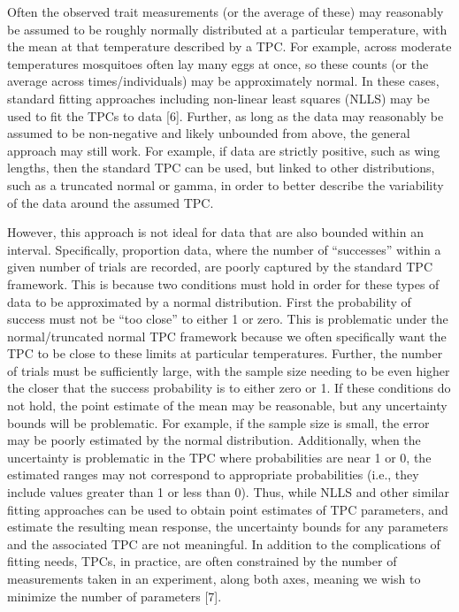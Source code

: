 \documentclass[
  11pt,
  letterpaper,
]{article}
\begin{document}
Often the observed trait measurements (or the average of these) may
reasonably be assumed to be roughly normally distributed at a particular
temperature, with the mean at that temperature described by a TPC. For
example, across moderate temperatures mosquitoes often lay many eggs at
once, so these counts (or the average across times/individuals) may be
approximately normal. In these cases, standard fitting approaches
including non-linear least squares (NLLS) may be used to fit the TPCs to
data {[}6{]}. Further, as long as the data may reasonably be assumed to
be non-negative and likely unbounded from above, the general approach
may still work. For example, if data are strictly positive, such as wing
lengths, then the standard TPC can be used, but linked to other
distributions, such as a truncated normal or gamma, in order to better
describe the variability of the data around the assumed TPC.

However, this approach is not ideal for data that are also bounded
within an interval. Specifically, proportion data, where the number of
``successes'' within a given number of trials are recorded, are poorly
captured by the standard TPC framework. This is because two conditions
must hold in order for these types of data to be approximated by a
normal distribution. First the probability of success must not be ``too
close'' to either 1 or zero. This is problematic under the
normal/truncated normal TPC framework because we often specifically want
the TPC to be close to these limits at particular temperatures. Further,
the number of trials must be sufficiently large, with the sample size
needing to be even higher the closer that the success probability is to
either zero or 1. If these conditions do not hold, the point estimate of
the mean may be reasonable, but any uncertainty bounds will be
problematic. For example, if the sample size is small, the error may be
poorly estimated by the normal distribution. Additionally, when the
uncertainty is problematic in the TPC where probabilities are near 1 or
0, the estimated ranges may not correspond to appropriate probabilities
(i.e., they include values greater than 1 or less than 0). Thus, while
NLLS and other similar fitting approaches can be used to obtain point
estimates of TPC parameters, and estimate the resulting mean response,
the uncertainty bounds for any parameters and the associated TPC are not
meaningful. In addition to the complications of fitting needs, TPCs, in
practice, are often constrained by the number of measurements taken in
an experiment, along both axes, meaning we wish to minimize the number
of parameters {[}7{]}.
\end{document}
